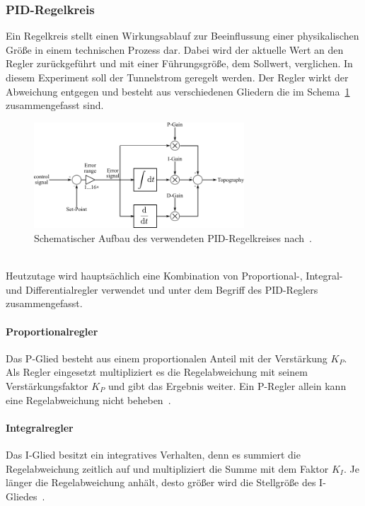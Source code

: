 \documentclass[a4paper,twoside,final]{article}
\begin{document}
\subsubsection{PID-Regelkreis}
Ein Regelkreis stellt einen Wirkungsablauf zur Beeinflussung einer physikalischen Größe in einem technischen Prozess dar. Dabei wird der aktuelle Wert an den Regler zurückgeführt und mit einer Führungsgröße, dem Sollwert, verglichen. In diesem Experiment soll der Tunnelstrom geregelt werden. Der Regler wirkt der Abweichung entgegen und besteht aus verschiedenen Gliedern die im Schema~\ref{fig:PID} zusammengefasst sind.
\begin{figure}[htp]
    \centering
    \includegraphics[width=0.7\textwidth]{Bilder/PID-Regler.pdf}
    \caption{Schematischer Aufbau des verwendeten PID-Regelkreises nach~\cite{Nanosurf}.}
    \label{fig:PID}
\end{figure}\\
Heutzutage wird hauptsächlich eine Kombination von Proportional-, Integral- und Differentialregler verwendet und unter dem Begriff des PID-Reglers zusammengefasst.
\paragraph{Proportionalregler} Das P-Glied besteht aus einem proportionalen Anteil mit der Verstärkung $K_P$. Als Regler eingesetzt multipliziert es die Regelabweichung mit seinem Verstärkungsfaktor $K_P$ und gibt das Ergebnis weiter. Ein P-Regler allein kann eine Regelabweichung nicht beheben~\cite{Forker}.
\paragraph{Integralregler} Das I-Glied besitzt ein integratives Verhalten, denn es summiert die Regelabweichung zeitlich auf und multipliziert die Summe mit dem Faktor $K_I$. Je länger die Regelabweichung anhält, desto größer wird die Stellgröße des I-Gliedes~\cite{Forker}.
\end{document}
